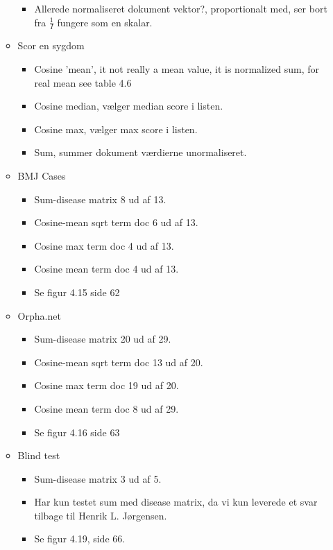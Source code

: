 \documentclass[a4paper, 10pt, english, final]{report}
\begin{document}
\begin{itemize}
\begin{itemize}
\begin{itemize}
          \item Allerede normaliseret dokument vektor?, proportionalt
            med, ser bort fra $\frac{1}{I}$ fungere som en skalar.
        \end{itemize}
      \item Scor en sygdom
        \begin{itemize}
          \item Cosine 'mean', it not really a mean value, it is normalized sum, for real mean see table 4.6
          \item Cosine median, v\ae lger median score i listen.
          \item Cosine max, v\ae lger max score i listen.
          \item Sum, summer dokument v\ae rdierne unormaliseret.
        \end{itemize}
      \item BMJ Cases
        \begin{itemize}
          \item Sum-disease matrix 8 ud af 13.
          \item Cosine-mean sqrt term doc 6 ud af 13.
          \item Cosine max term doc 4 ud af 13.
          \item Cosine mean term doc 4 ud af 13.
          \item Se figur 4.15 side 62
        \end{itemize}
      \item Orpha.net
        \begin{itemize}
          \item Sum-disease matrix 20 ud af 29.
          \item Cosine-mean sqrt term doc 13 ud af 20.
          \item Cosine max term doc 19 ud af 20.
          \item Cosine mean term doc 8 ud af 29.
          \item Se figur 4.16 side 63
        \end{itemize}
      \item Blind test
        \begin{itemize}
          \item Sum-disease matrix 3 ud af 5.
          \item Har kun testet sum med disease matrix, da vi kun
            leverede et svar tilbage til Henrik L. J\o rgensen.
          \item Se figur 4.19, side 66.

\end{itemize}
\end{itemize}
\end{itemize}
\end{document}
